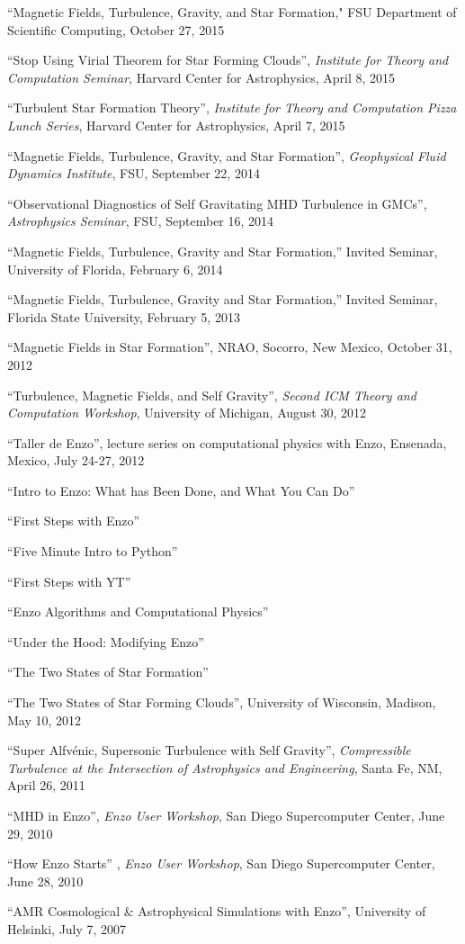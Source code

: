\medskip
\noindent
``Magnetic Fields, Turbulence, Gravity, and Star Formation," FSU Department of
Scientific Computing, October 27, 2015

\medskip
\noindent
``Stop Using Virial Theorem for Star Forming Clouds'',
{\it Institute for Theory and Computation Seminar}, Harvard Center
for Astrophysics,  April 8, 2015

\medskip
\noindent
``Turbulent Star Formation Theory'',
{\it Institute for Theory and Computation Pizza Lunch Series}, Harvard Center
for Astrophysics,  April 7, 2015

\medskip
\noindent
``Magnetic Fields, Turbulence, Gravity, and Star Formation'',
{\it Geophysical Fluid Dynamics Institute}, FSU,  September 22, 2014

\medskip
\noindent
``Observational Diagnostics of Self Gravitating MHD Turbulence in GMCs'',
{\it Astrophysics Seminar}, FSU,  September 16, 2014

\medskip
\noindent
``Magnetic Fields, Turbulence, Gravity and Star Formation,'' Invited Seminar,
University of Florida, February 6, 2014

\medskip
\noindent
``Magnetic Fields, Turbulence, Gravity and Star Formation,'' Invited Seminar, Florida
State University, February 5, 2013 

\medskip
\noindent
``Magnetic Fields in Star Formation'', NRAO, Socorro, New Mexico, October 31,
2012

\medskip
\noindent
``Turbulence, Magnetic Fields, and Self Gravity'', {\it Second ICM Theory and
Computation Workshop}, University of Michigan, August 30, 2012

\medskip
\noindent
``Taller de Enzo'',  lecture series on computational physics
with Enzo, Ensenada, Mexico, July 24-27, 2012

``Intro to Enzo: What has Been Done, and What You Can Do''

``First Steps with Enzo''

``Five Minute Intro to Python''

``First Steps with YT''

``Enzo Algorithms and Computational Physics''

``Under the Hood: Modifying Enzo''

``The Two States of Star Formation''

\medskip
\noindent
``The Two States of Star Forming Clouds'', University of Wisconsin,
Madison, May 10, 2012

\medskip
\noindent
``Super Alfv\' enic, Supersonic Turbulence with Self Gravity'',  {\it
Compressible Turbulence at the Intersection of Astrophysics and Engineering},  Santa
Fe, NM, April 26, 2011

\medskip
\noindent
``MHD in Enzo'', {\it Enzo User Workshop},  San Diego Supercomputer Center,
June 29,  2010 

\medskip
\noindent
``How Enzo Starts'' , {\it Enzo User Workshop}, San Diego Supercomputer
Center, June 28, 2010

\medskip
\noindent
``AMR Cosmological \& Astrophysical Simulations with Enzo'', University of
Helsinki, July 7, 2007

